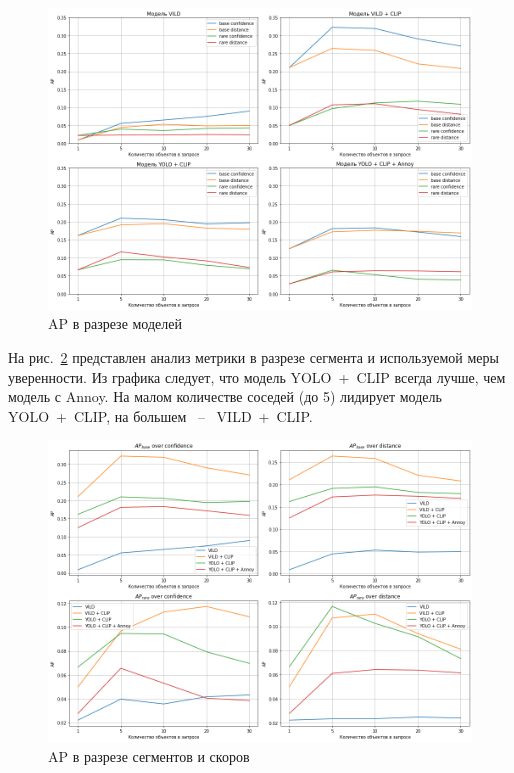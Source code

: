 \documentclass[a4paper,14pt]{article}
\begin{document}
 	\begin{figure}[H]
		\centering
		\includegraphics[width=0.999\linewidth]{images/average_precision_dataset}
		\caption{AP в разрезе моделей}
		\label{fig:average_precision_dataset}
	\end{figure}

	На рис.~\ref{fig:average_precision_metrics} представлен анализ метрики в разрезе сегмента и используемой меры уверенности.
	Из графика следует, что модель YOLO~+~CLIP всегда лучше, чем модель с Annoy.
	На малом количестве соседей (до 5) лидирует модель YOLO~+~CLIP, на большем ~--~ VILD~+~CLIP.

 	\begin{figure}[H]
		\centering
		\includegraphics[width=0.999\linewidth]{images/average_precision_metrics}
		\caption{AP в разрезе сегментов и скоров}
		\label{fig:average_precision_metrics}
	\end{figure}
\end{document}
